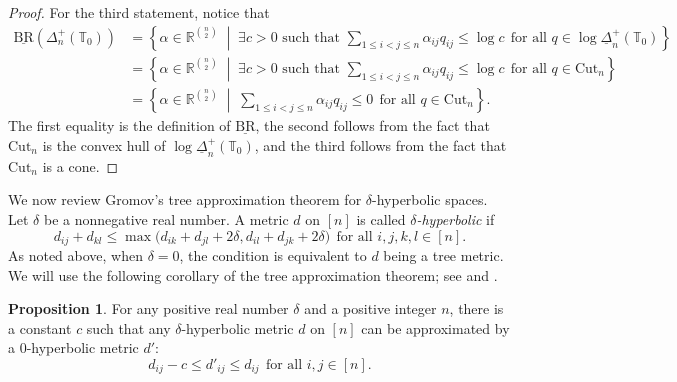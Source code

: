 \documentclass{amsart}
\theoremstyle{definition}
\newtheorem{proposition}[theorem]{Proposition}
\theoremstyle{remark}
\def\RR{\mathbb{R}}
\def\T{\mathbb{T}}
\def\BR{\mathrm{BR}}
\def\Cut{\mathrm{Cut}}
\begin{document}
\begin{proof}
For the third statement, notice that
\begin{align*}
\underline{\BR}\left(\Delta_n^+(\T_0)\right)
&=\left\{ \alpha \in \RR^{\binom{n}{2}}  \;\middle|\;  \exists c> 0\text{ such that } \sum_{1\le i< j\le n}\alpha_{ij}q_{ij}\le 	\log c \ \ \text{for all $q\in \log \underline{\Delta}_n^+(\T_0)$}\right\}\\
&=\left\{ \alpha\in \RR^{\binom{n}{2}}  \;\middle|\;  \exists c> 0\text{ such that } \sum_{1\le i< j\le n}\alpha_{ij}q_{ij}\le 	\log c \ \ \text{for all $q\in \Cut_n$}\right\}\\
&= \left\{ \alpha \in \RR^{\binom{n}{2}}  \;\middle|\;  \sum_{1\le i< j\le n}\alpha_{ij}q_{ij}\le 0 \ \ \text{for all $q\in \Cut_n$}\right\}.
\end{align*}
The first equality is the definition of $\underline{\BR}$, the second follows from the fact that $\Cut_n$ is the convex hull of $\log \underline{\Delta}_n^+(\T_0)$, and the third follows from the fact that $\Cut_n$ is a cone.
\end{proof}



We now review Gromov's tree approximation theorem for $\delta$-hyperbolic spaces. %
Let $\delta$ be a nonnegative real number. A metric $d$  on $[n]$ 
is called \emph{$\delta$-hyperbolic} if
\[
d_{ij}+d_{kl}\le \max \bigl(d_{ik}+d_{jl}+2\delta, d_{il}+d_{jk}+2\delta\bigr) \ \ \text{for all $i,j,k,l\in [n]$.}
\]
As noted above, when $\delta=0$, the condition is equivalent to $d$ being a tree metric. 
We will use the following corollary of the tree approximation theorem; see {\cite[Section 6.1]{Gromov} and \cite[Chapitre 2]{GdlH}}.

\begin{proposition}%
	\label{prop:tree-approx}
	For any positive real number $\delta$ and a positive integer $n$,  
there is a constant $c$ %
such that any $\delta$-hyperbolic metric $d$ on $[n]$ can be approximated by a $0$-hyperbolic metric $d'$: 
		\[
        d_{ij}-c\le d'_{ij}\le d_{ij} \ \ \text{for all $i,j \in [n]$}.
        \]
\end{proposition}
\end{document}
